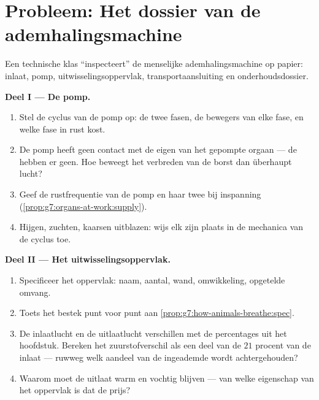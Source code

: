 \section{Probleem: Het dossier van de ademhalingsmachine}

\begin{problem}\label{pb:g7:lungs-and-gas-exchange:1}
Een technische klas ``inspecteert'' de menselijke ademhalingsmachine op
papier: inlaat, pomp, uitwisselingsoppervlak, transportaansluiting en
onderhoudsdossier.

\medskip\noindent\textbf{Deel I --- De pomp.}
\begin{enumerate}
  \item Stel de cyclus van de pomp op: de twee fasen, de bewegers van
        elke fase, en welke fase in rust  kost.
  \item De pomp heeft geen contact met de eigen  van het gepompte
        orgaan --- de  hebben er geen. Hoe beweegt het verbreden van
        de borst dan überhaupt lucht?
  \item Geef de rustfrequentie van de pomp en haar twee  bij
        inspanning
        (\cref{prop:g7:organs-at-work:supply}).
  \item Hijgen, zuchten, kaarsen uitblazen: wijs elk zijn plaats in de
        mechanica van de cyclus toe.
\end{enumerate}

\medskip\noindent\textbf{Deel II --- Het
uitwisselingsoppervlak.}
\begin{enumerate}[resume]
  \item Specificeer het oppervlak: naam, aantal, wand, omwikkeling,
        opgetelde omvang.
  \item Toets het bestek punt voor punt aan
        \cref{prop:g7:how-animals-breathe:spec}.
  \item De inlaatlucht en de uitlaatlucht verschillen met de percentages
        uit het hoofdstuk. Bereken het zuurstofverschil als een deel van
        de $21$ procent van de inlaat --- ruwweg welk aandeel van de
        ingeademde  wordt achtergehouden?
  \item Waarom moet de uitlaat warm en vochtig blijven --- van welke
        eigenschap van het oppervlak is dat de prijs?
\end{enumerate}


\end{problem}
